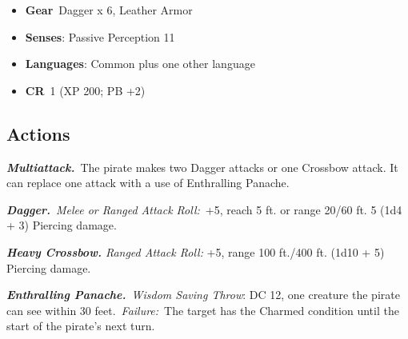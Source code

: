 \documentclass[10pt,twocolumn]{article}
\newcommand{\sectionsize}{\LARGE}
\newcommand{\subsectionsize}{\Large}
\newcommand{\subsubsectionsize}{\large}
\let\oldtextbf\textbf
\renewcommand{\textbf}[1]{\oldtextbf{{#1}}}
\providecommand{\tightlist}{
  \setlength{\itemsep}{4pt}
  \setlength{\topsep}{0pt}
  \setlength{\parsep}{0pt}
  \setlength{\parskip}{0pt}
  \setlength{\partopsep}{0pt}
}
\begin{document}
\setlength{\itemsep}{0pt}

\begin{itemize}
\tightlist
\item
  \textbf{Gear}~Dagger x 6, Leather Armor
\item
  \textbf{Senses}: Passive Perception 11
\item
  \textbf{Languages}: Common plus one other language
\item
  \textbf{CR}~1 (XP 200; PB +2)
\end{itemize}

\subsection{Actions}\label{actions-6}

\emph{\textbf{Multiattack.}}~The pirate makes two Dagger attacks or one
Crossbow attack. It can replace one attack with a use of Enthralling
Panache.

\emph{\textbf{Dagger.}}~\emph{Melee or Ranged Attack Roll:}~+5, reach 5
ft. or range 20/60 ft. 5 (1d4 + 3) Piercing damage.

\emph{\textbf{Heavy Crossbow.} Ranged Attack Roll:} +5, range 100
ft./400 ft. (1d10 + 5) Piercing damage.

\emph{\textbf{Enthralling Panache.}}~\emph{Wisdom Saving Throw}: DC 12,
one creature the pirate can see within 30 feet.~\emph{Failure:}~The
target has the Charmed condition until the start of the pirate's next
turn.

\endgroup

\vfill\break

\begingroup

\makeatletter
{}
\monsterFont
\fontsize{9pt}{10pt}\selectfont
\setlength{\parskip}{4pt}
\makeatletter
{}

\renewcommand{\sectionsize}{\Large}
\renewcommand{\subsectionsize}{\normalsize}
\renewcommand{\subsubsectionsize}{\normalsize}

\titlespacing*{\section}{0pt}{6pt}{4pt}
\titlespacing*{\subsection}{0pt}{6pt}{4pt}
\titlespacing*{\subsubsection}{0pt}{4pt}{4pt}
\titlespacing*{\subsubsubsection}{0pt}{4pt}{4pt}
\end{document}
